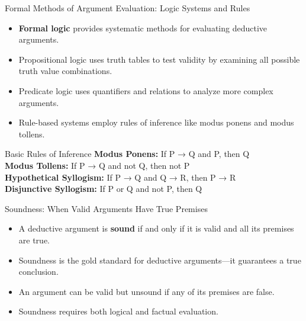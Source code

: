 \documentclass{beamer}
\begin{document}
\begin{frame}{Formal Methods of Argument Evaluation: Logic Systems and Rules}
    \begin{itemize}
        \item \textbf{Formal logic} provides systematic methods for evaluating deductive arguments.
        \item Propositional logic uses truth tables to test validity by examining all possible truth value combinations.
        \item Predicate logic uses quantifiers and relations to analyze more complex arguments.
        \item Rule-based systems employ rules of inference like modus ponens and modus tollens.
    \end{itemize}
    
    \begin{block}{Basic Rules of Inference}
        \textbf{Modus Ponens:} If P → Q and P, then Q\\
        \textbf{Modus Tollens:} If P → Q and not Q, then not P\\
        \textbf{Hypothetical Syllogism:} If P → Q and Q → R, then P → R\\
        \textbf{Disjunctive Syllogism:} If P or Q and not P, then Q
    \end{block}
\end{frame}

\begin{frame}{Soundness: When Valid Arguments Have True Premises}
    \begin{itemize}
        \item A deductive argument is \textbf{sound} if and only if it is valid and all its premises are true.
        \item Soundness is the gold standard for deductive arguments—it guarantees a true conclusion.
        \item An argument can be valid but unsound if any of its premises are false.
        \item Soundness requires both logical and factual evaluation.
    \end{itemize}
    
\end{frame}
\end{document}
